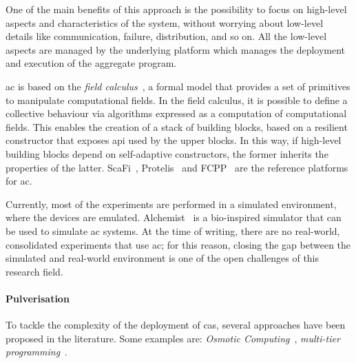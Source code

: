 \documentclass[12pt]{article}
\begin{document}
One of the main benefits of this approach is the possibility to focus on high-level aspects and characteristics of the system,
without worrying about low-level details like communication, failure, distribution, and so on.
%
All the low-level aspects are managed by the underlying platform which manages the deployment and execution of the aggregate program.

\ac{ac} is based on the \emph{field calculus}~\cite{HOFC},
a formal model that provides a set of primitives to manipulate computational fields.
%
In the field calculus,
it is possible to define a collective behaviour via algorithms expressed as a computation of computational fields.
%
This enables the creation of a stack of building blocks,
based on a resilient constructor that exposes \ac{api} used by the upper blocks.
%
In this way,
if high-level building blocks depend on self-adaptive constructors,
the former inherits the properties of the latter.
%
ScaFi~\cite{CASADEI2022101248}, Protelis~\cite{10.1145/2695664.2695913} and FCPP~\cite{9196401} are the reference platforms for \ac{ac}.

Currently, most of the experiments are performed in a simulated environment,
where the devices are emulated.
%
Alchemist~\cite{pianini2013chemical} is a bio-inspired simulator that can be used to simulate \ac{ac} systems.
%
At the time of writing,
there are no real-world, consolidated experiments that use \ac{ac};
for this reason,
closing the gap between the simulated and real-world environment is one of the open challenges of this research field.

\paragraph{Pulverisation}
To tackle the complexity of the deployment of \ac{cas},
several approaches have been proposed in the literature.
%
Some examples are: \emph{Osmotic Computing}~\cite{DBLP:journals/tiot/NehaPSSG22}, \emph{multi-tier programming}~\cite{DBLP:journals/csur/WeisenburgerWS20}.
\end{document}
